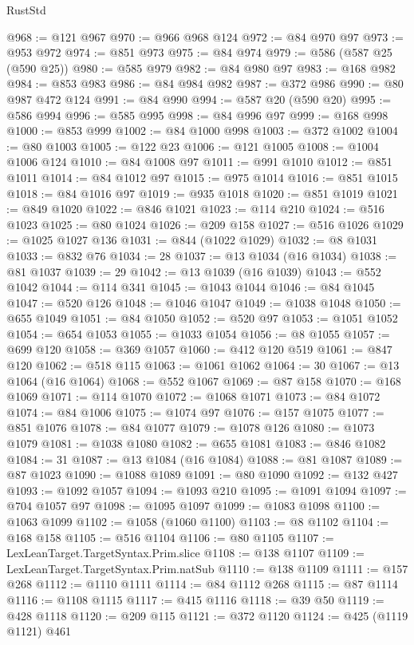 \begin{lexlean}{RustStd}
\begin{coremodule}
{\begin{coremodule}
{{{{{{{{{{{{{{{{{{{{{{{{{{{{{{{{{{{{{{{{{{{{{{{{{{{{{{@968 := @121 @967
@970 := @966 @968 @124
@972 := @84 @970 @97
@973 := @953 @972
@974 := @851 @973
@975 := @84 @974
@979 := @586 (@587 @25 (@590 @25))
@980 := @585 @979
@982 := @84 @980 @97
@983 := @168 @982
@984 := @853 @983
@986 := @84 @984 @982
@987 := @372 @986
@990 := @80 @987 @472 @124
@991 := @84 @990
@994 := @587 @20 (@590 @20)
@995 := @586 @994
@996 := @585 @995
@998 := @84 @996 @97
@999 := @168 @998
@1000 := @853 @999
@1002 := @84 @1000 @998
@1003 := @372 @1002
@1004 := @80 @1003
@1005 := @122 @23
@1006 := @121 @1005
@1008 := @1004 @1006 @124
@1010 := @84 @1008 @97
@1011 := @991 @1010
@1012 := @851 @1011
@1014 := @84 @1012 @97
@1015 := @975 @1014
@1016 := @851 @1015
@1018 := @84 @1016 @97
@1019 := @935 @1018
@1020 := @851 @1019
@1021 := @849 @1020
@1022 := @846 @1021
@1023 := @114 @210
@1024 := @516 @1023
@1025 := @80 @1024
@1026 := @209 @158
@1027 := @516 @1026
@1029 := @1025 @1027 @136
@1031 := @844 (@1022 @1029)
@1032 := @8 @1031
@1033 := @832 @76
@1034 := 28
@1037 := @13 @1034 (@16 @1034)
@1038 := @81 @1037
@1039 := 29
@1042 := @13 @1039 (@16 @1039)
@1043 := @552 @1042
@1044 := @114 @341
@1045 := @1043 @1044
@1046 := @84 @1045
@1047 := @520 @126
@1048 := @1046 @1047
@1049 := @1038 @1048
@1050 := @655 @1049
@1051 := @84 @1050
@1052 := @520 @97
@1053 := @1051 @1052
@1054 := @654 @1053
@1055 := @1033 @1054
@1056 := @8 @1055
@1057 := @699 @120
@1058 := @369 @1057
@1060 := @412 @120 @519
@1061 := @847 @120
@1062 := @518 @115
@1063 := @1061 @1062
@1064 := 30
@1067 := @13 @1064 (@16 @1064)
@1068 := @552 @1067
@1069 := @87 @158
@1070 := @168 @1069
@1071 := @114 @1070
@1072 := @1068 @1071
@1073 := @84 @1072
@1074 := @84 @1006
@1075 := @1074 @97
@1076 := @157 @1075
@1077 := @851 @1076
@1078 := @84 @1077
@1079 := @1078 @126
@1080 := @1073 @1079
@1081 := @1038 @1080
@1082 := @655 @1081
@1083 := @846 @1082
@1084 := 31
@1087 := @13 @1084 (@16 @1084)
@1088 := @81 @1087
@1089 := @87 @1023
@1090 := @1088 @1089
@1091 := @80 @1090
@1092 := @132 @427
@1093 := @1092 @1057
@1094 := @1093 @210
@1095 := @1091 @1094
@1097 := @704 @1057 @97
@1098 := @1095 @1097
@1099 := @1083 @1098
@1100 := @1063 @1099
@1102 := @1058 (@1060 @1100)
@1103 := @8 @1102
@1104 := @168 @158
@1105 := @516 @1104
@1106 := @80 @1105
@1107 := LexLeanTarget.TargetSyntax.Prim.slice
@1108 := @138 @1107
@1109 := LexLeanTarget.TargetSyntax.Prim.natSub
@1110 := @138 @1109
@1111 := @157 @268
@1112 := @1110 @1111
@1114 := @84 @1112 @268
@1115 := @87 @1114
@1116 := @1108 @1115
@1117 := @415 @1116
@1118 := @39 @50
@1119 := @428 @1118
@1120 := @209 @115
@1121 := @372 @1120
@1124 := @425 (@1119 @1121) @461
}}}}}}}}}}}}}}}}}}}}}}}}}}}}}}}}}}}}}}}}}}}}}}}}}}}}}}
\end{coremodule}}
\end{coremodule}
\end{lexlean}
